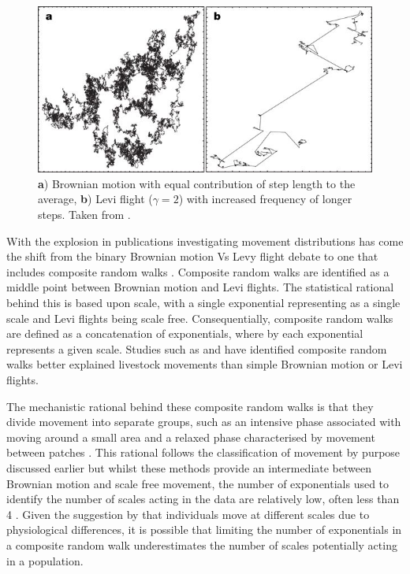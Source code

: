 \documentclass[11pt,usenames,dvipsnames]{article}
\begin{document}
\begin{figure}[H]
	\centering
	\includegraphics[scale=0.7]{LeviFlight.jpg}
	\caption{\textbf{a}) Brownian motion with equal contribution of step length to the average, \textbf{b}) Levi flight ($\gamma = 2$) with increased frequency of longer steps. Taken from \cite{Barthelemy2008}.}
\end{figure}

With the explosion in publications investigating movement distributions has come the shift from the binary Brownian motion Vs Levy flight debate to one that includes composite random walks \citep{Petrovskii2011,Sakamoto2017,Gautestad2012}. Composite random walks are identified as a middle point between Brownian motion and Levi flights. The statistical rational behind this is based upon scale, with a single exponential representing as a single scale and Levi flights being scale free. Consequentially, composite random walks are defined as a concatenation of exponentials, where by each exponential represents a given scale. Studies such as \cite{Sakamoto2017} and \cite{Zhao2016} have identified composite random walks better explained livestock movements than simple Brownian motion or Levi flights. 

The mechanistic rational behind these composite random walks is that they divide movement into separate groups, such as an intensive phase associated with moving around a small area and a relaxed phase characterised by movement between patches \citep{Auger-Methe2015}. This rational follows the classification of movement by purpose discussed earlier but whilst these methods provide an intermediate between Brownian motion and scale free movement, the number of exponentials used to identify the number of scales acting in the data are relatively low, often less than 4 \citep{Sakamoto2017,Zhao2016}. Given the suggestion by \cite{Petrovskii2011} that individuals move at different scales due to physiological differences, it is possible that limiting the number of exponentials in a composite random walk underestimates the number of scales potentially acting in a population. 
\end{document}
